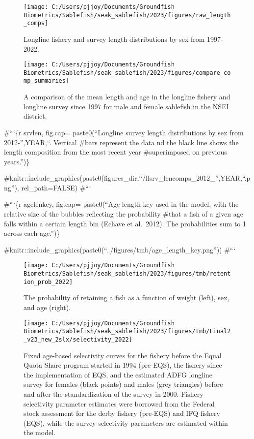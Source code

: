 \documentclass[
]{article}
\begin{document}
\begin{figure}[H]
\texttt{[image: C:/Users/pjjoy/Documents/Groundfish Biometrics/Sablefish/seak\_sablefish/2023/figures/raw\_length\_comps]} \caption{Longline fishery and survey length distributions by sex from 1997-2022.}\label{fig:lencomp}
\end{figure}

\begin{figure}[H]
\texttt{[image: C:/Users/pjjoy/Documents/Groundfish Biometrics/Sablefish/seak\_sablefish/2023/figures/compare\_comp\_summaries]} \caption{A comparison of the mean length and age in the longline fishery and longline survey since 1997 for male and female sablefish in the NSEI district.}\label{fig:compcomps}
\end{figure}

\#```\{r srvlen, fig.cap= paste0(``Longline survey length distributions by sex from 2012-'',YEAR,``. Vertical \#bars represent the data nd the black line shows the length composition from the most recent year \#superimposed on previous years.'')\}

\#knitr::include\_graphics(paste0(figures\_dir,``/llsrv\_lencomps\_2012\_'',YEAR,``.png''), rel\_path=FALSE)
\#```

\#```\{r agelenkey, fig.cap= paste0(``Age-length key used in the model, with the relative size of the bubbles reflecting the probability \#that a fish of a given age falls within a certain length bin (Echave et al.~2012). The probabilities sum to 1 across each age.'')\}

\#knitr::include\_graphics(paste0(``../figures/tmb/age\_length\_key.png''))
\#```

\begin{figure}[H]
\texttt{[image: C:/Users/pjjoy/Documents/Groundfish Biometrics/Sablefish/seak\_sablefish/2023/figures/tmb/retention\_prob\_2022]} \caption{The probability of retaining a fish as a function of weight (left), sex, and age (right).}\label{fig:retention}
\end{figure}

\begin{figure}[H]
\texttt{[image: C:/Users/pjjoy/Documents/Groundfish Biometrics/Sablefish/seak\_sablefish/2023/figures/tmb/Final2\_v23\_new\_2slx/selectivity\_2022]} \caption{Fixed age-based selectivity curves for the fishery before the Equal Quota Share program started in 1994 (pre-EQS), the fishery since the implementation of EQS, and the estimated ADFG longline survey for females (black points) and males (grey triangles) before and after the standardization of the survey in 2000. Fishery selectivity parameter estimates were borrowed from the Federal stock assessment for the derby fishery (pre-EQS) and IFQ fishery (EQS), while the survey selectivity parameters are estimated within the model.}\label{fig:slx}
\end{figure}
\end{document}
